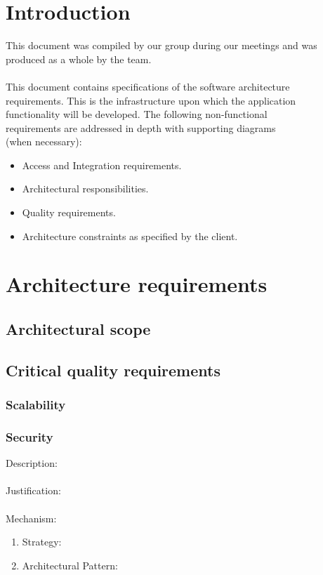\documentclass[a4paper,12pt,titlepage]{article}
\begin{document}



\newpage
\tableofcontents


\newpage
\section{Introduction}

This document was compiled by our group during our meetings and was produced as a whole by the team.\\\\

This document contains specifications of the software architecture 
\\requirements. This is the infrastructure upon which the application
\\ functionality will be developed. The following non-functional
\\ requirements are addressed in depth with supporting diagrams
\\(when necessary):

\begin{itemize}
	\item Access and Integration requirements.
	\item Architectural responsibilities.
	\item Quality requirements.
	\item Architecture constraints as specified by the client. 
\end{itemize}

\newpage

\section{Architecture requirements}
\subsection{Architectural scope}
\newpage
\subsection{Critical quality requirements}
\subsubsection{Scalability}%
	
\subsubsection{Security}%
	Description: \\\\
	Justification: \\\\
	Mechanism:
	\begin{enumerate}
		\item Strategy: 
		\item Architectural Pattern:
	\end{enumerate}
\end{document}
